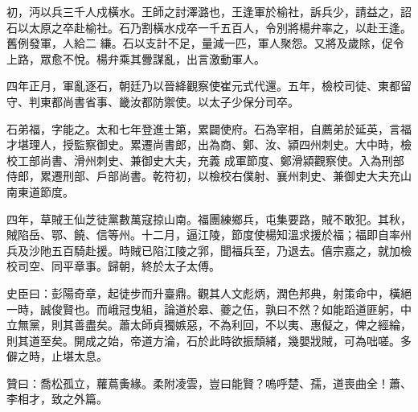 \begin{pinyinscope}
 初，沔以兵三千人戍橫水。王師之討澤潞也，王逢軍於榆社，訴兵少，請益之，詔石以太原之卒赴榆社。石乃割橫水戍卒一千五百人，令別將楊弁率之，以赴王逢。舊例發軍，人給二
 縑。石以支計不足，量減一匹，軍人聚怨。又將及歲除，促令上路，眾愈不悅。楊弁乘其釁謀亂，出言激動軍人。



 四年正月，軍亂逐石，朝廷乃以晉絳觀察使崔元式代還。五年，檢校司徒、東都留守、判東都尚書省事、畿汝都防禦使。以太子少保分司卒。



 石弟福，字能之。太和七年登進士第，累闢使府。石為宰相，自薦弟於延英，言福才堪理人，授監察御史。累遷尚書郎，出為商、鄭、汝、潁四州刺史。大中時，檢校工部尚書、滑州刺史、兼御史大夫，充義
 成軍節度、鄭滑潁觀察使。入為刑部侍郎，累遷刑部、戶部尚書。乾符初，以檢校右僕射、襄州刺史、兼御史大夫充山南東道節度。



 四年，草賊王仙芝徒黨數萬寇掠山南。福團練鄉兵，屯集要路，賊不敢犯。其秋，賊陷岳、鄂、饒、信等州。十二月，逼江陵，節度使楊知溫求援於福；福即自率州兵及沙阤五百騎赴援。時賊已陷江陵之郛，聞福兵至，乃退去。僖宗嘉之，就加檢校司空、同平章事。歸朝，終於太子太傅。



 史臣曰：彭陽奇章，起徒步而升臺鼎。觀其人文彪炳，潤色邦典，射策命中，橫絕一時，誠俊賢也。而峨冠曳組，論道於皋、夔之伍，孰曰不然？如能蹈道匪躬，中立無黨，則其善盡矣。蕭太師貞獨嫉惡，不為利回，不以夷、惠儗之，俾之經綸，則其道至矣。開成之始，帝道方淪，石於此時欲振頹緒，幾嬰戕賊，可為咄嗟。多僻之時，止堪太息。



 贊曰：喬松孤立，蘿蔦夤緣。柔附凌雲，豈曰能賢？嗚呼楚、孺，道喪曲全！蕭、李相才，致之外篇。



\end{pinyinscope}
